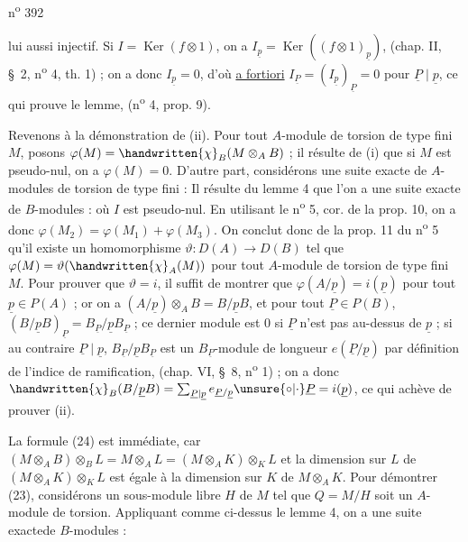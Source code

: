 n\textsuperscript{o} 392

lui aussi injectif. Si $I=\operatorname{Ker}(f\otimes 1)$, on a $I_{\underline p}=\operatorname{Ker}((f\otimes 1)_{\underline p})$, (chap. II, \S~2, n\textsuperscript{o} 4, th. 1) ; on a donc $I_{\underline p}=0$, d'où \uline{a fortiori} $I_{\underline P}=(I_{\underline p})_{\underline P}=0$ pour $\underline P\mid\underline p$, ce qui prouve le lemme, (n\textsuperscript{o} 4, prop. 9).

Revenons à la démonstration de (ii). Pour tout $A$-module de torsion de type fini $M$, posons $\varphi(M)=\handwritten{\chi}_B(M\otimes_A B)$ ; il résulte de (i) que si $M$ est pseudo-nul, on a $\varphi(M)=0$. D'autre part, considérons une suite exacte de $A$-modules de torsion de type fini :
Il résulte du lemme 4 que l'on a une suite exacte de $B$-modules :
où $I$ est pseudo-nul. En utilisant le n\textsuperscript{o} 5, cor. de la prop. 10, on a donc $\varphi(M_2)=\varphi(M_1)+\varphi(M_3)$. On conclut donc de la prop. 11 du n\textsuperscript{o} 5 qu'il existe un homomorphisme $\vartheta:D(A)\longrightarrow D(B)$ tel que $\varphi(M)=\vartheta(\handwritten{\chi}_A(M))$ pour tout $A$-module de torsion de type fini $M$. Pour prouver que $\vartheta=i$, il suffit de montrer que $\varphi(A/\underline p)=i(\underline p)$ pour tout $\underline p\in P(A)$ ; or on a $(A/\underline p)\otimes_A B=B/\underline p B$, et pour tout $\underline P\in P(B)$, $(B/\underline p B)_{\underline P}=B_{\underline P}/\underline p B_{\underline P}$ ; ce dernier module est 0 si $\underline P$ n'est pas au-dessus de $\underline p$ ; si au contraire $\underline P\mid\underline p$, $B_{\underline P}/\underline p B_{\underline P}$ est un $B_{\underline P}$-module de longueur $e(\underline P/\underline p)$ par définition de l'indice de ramification, (chap. VI, \S~8, n\textsuperscript{o} 1) ; on a donc $\handwritten{\chi}_B(B/\underline p B)=\sum_{\underline P\mid\underline p}e_{\underline P/\underline p}\unsure{\circ|\cdot}\underline P=i(\underline p)$, ce qui achève de prouver (ii).

La formule (24) est immédiate, car $(M\otimes_A B)\otimes_B L=M\otimes_A L=(M\otimes_A K)\otimes_K L$ et la dimension sur $L$ de $(M\otimes_A K)\otimes_K L$ est égale à la dimension sur $K$ de $M\otimes_A K$. Pour démontrer (23), considérons un sous-module libre $H$ de $M$ tel que $Q=M/H$ soit un $A$-module de torsion. Appliquant comme ci-dessus le lemme 4, on a une suite exacte\unsure{-}de $B$-modules :
